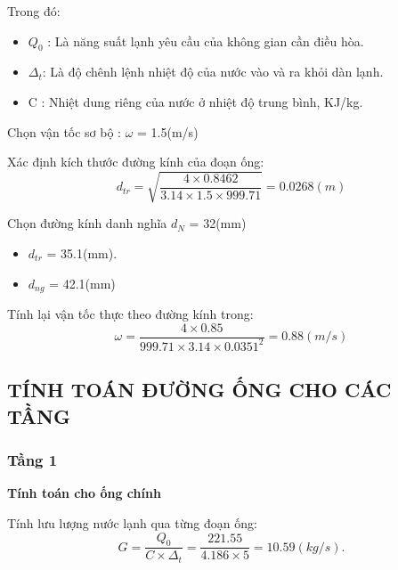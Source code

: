 Trong đó:
\begin{itemize}
	\item $Q_{0}$ : Là năng suất lạnh yêu cầu của không gian cần điều hòa.
	\item $\Delta_{t}$: Là độ chênh lệnh nhiệt độ của nước vào và ra khỏi dàn lạnh.
	\item C : Nhiệt dung riêng của nước ở nhiệt độ trung bình, KJ/kg.
\end{itemize}

Chọn vận tốc sơ bộ : $\omega$ = 1.5(m/s)

Xác định kích thước đường kính của đoạn ống:
\begin{equation*}
	d_{tr} = \sqrt{\dfrac{4 \times 0.8462}{3.14 \times 1.5 \times 999.71}} = 0.0268(m)
\end{equation*}

Chọn đường kính danh nghĩa $d_{N}$ = 32(mm)
\begin{itemize}
	\item $d_{tr}$ = 35.1(mm).
	\item $d_{ng}$ = 42.1(mm)
\end{itemize}

Tính lại vận tốc thực theo đường kính trong:
\begin{equation*}
	\omega = \dfrac{4 \times 0.85 }{999.71 \times 3.14 \times 0.0351^{2}} = 0.88(m/s)
\end{equation*}


\subsection{TÍNH TOÁN ĐƯỜNG ỐNG CHO CÁC TẦNG}

\subsubsection{Tầng 1}

\textbf{Tính toán cho ống chính}

Tính lưu lượng nước lạnh qua từng đoạn ống:
\begin{equation*}
	G = \dfrac{Q_{0}}{C \times \Delta_{t}} =\dfrac{221.55}{4.186 \times 5} = 10.59(kg/s).
\end{equation*}

